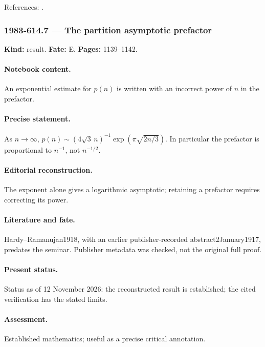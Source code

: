 \noindent References: \citep{vershikkerov1985dimensions}.\par

\subsubsection{1983-614.7 --- The partition asymptotic prefactor}

\label{item:1983-614.7}

\noindent\textbf{Kind:} result. \textbf{Fate:} E. \textbf{Pages:} 1139--1142.\par

\paragraph{Notebook content.} An exponential estimate for $p(n)$ is written with an incorrect power of $n$ in the prefactor.

\paragraph{Precise statement.} As $n\to\infty$, $p(n)\sim(4\sqrt3\,n)^{-1}\exp(\pi\sqrt{2n/3})$. In particular the prefactor is proportional to $n^{-1}$, not $n^{-1/2}$.

\paragraph{Editorial reconstruction.} The exponent alone gives a logarithmic asymptotic; retaining a prefactor requires correcting its power.

\paragraph{Literature and fate.} Hardy--Ramanujan1918, with an earlier publisher-recorded abstract2January1917, predates the seminar. Publisher metadata was checked, not the original full proof.

\paragraph{Present status.} Status as of 12 November 2026: the reconstructed result is established; the cited verification has the stated limits.

\paragraph{Assessment.} Established mathematics; useful as a precise critical annotation.

